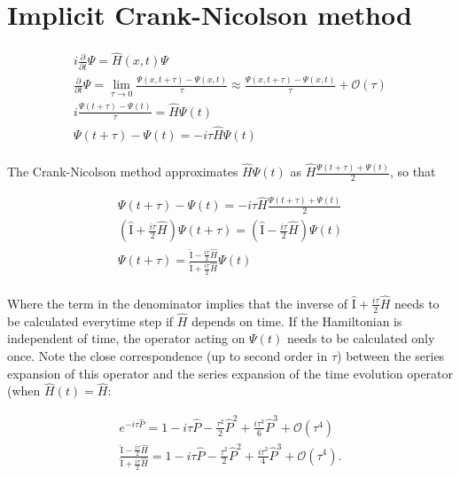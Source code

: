 \section{Implicit Crank-Nicolson method}
\begin{gather*}
i\frac{\partial}{\partial t}\Psi = \hat{H}(x,t)\Psi\\
\frac{\partial}{\partial t}\Psi = \lim_{\tau\rightarrow 0}\frac{\Psi(x,t+\tau)-\Psi(x,t)}{\tau} \approx \frac{\Psi(x,t+\tau)-\Psi(x,t)}{\tau}+\mathcal{O}(\tau)\\
i\frac{\Psi(t+\tau)-\Psi(t)}{\tau} = \hat{H}\Psi(t)\\
\Psi(t+\tau)-\Psi(t) = -i\tau\hat{H}\Psi(t)\\
\end{gather*}

The Crank-Nicolson method approximates $\hat{H}\Psi(t)$ as  $\hat{H}\frac{\Psi(t+\tau)+\Psi(t)}{2}$, so that

\begin{gather*}
\Psi(t+\tau)-\Psi(t) = -i\tau\hat{H}\frac{\Psi(t+\tau)+\Psi(t)}{2}\\
\left(\hat{\mathrm{I}}+\frac{i\tau}{2}\hat{H}\right)\Psi(t+\tau) = \left(\hat{\mathrm{I}}-\frac{i\tau}{2}\hat{H}\right)\Psi(t)\\
\Psi(t+\tau) = \frac{\hat{\mathrm{I}}-\frac{i\tau}{2}\hat{H}}{\hat{\mathrm{I}}+\frac{i\tau}{2}\hat{H}}\Psi(t)\\
\end{gather*}

Where the term in the denominator implies that the inverse of $\hat{\mathrm{I}}+\frac{i\tau}{2}\hat{H}$ needs to be calculated everytime step if $\hat{H}$ depends on time. If the Hamiltonian is independent of time, the operator acting on $\Psi(t)$ needs to be calculated only once. Note the close correspondence (up to second order in $\tau$) between the series expansion of this operator and the series expansion of the time evolution operator (when $\hat{H}(t) = \hat{H}$:

\begin{gather*}
e^{-i\tau\hat{P}} = 1 - i \tau\hat{P} - \frac{\tau^2}{2}\hat{P}^2 + \frac{i\tau^3}{6}\hat{P}^3 + \mathcal{O}(\tau^4)\\
\frac{\hat{\mathrm{I}}-\frac{i\tau}{2}\hat{H}}{\hat{\mathrm{I}}+\frac{i\tau}{2}\hat{H}} = 1 - i \tau\hat{P} - \frac{\tau^2}{2}\hat{P}^2 + \frac{i\tau^3}{4}\hat{P}^3 + \mathcal{O}(\tau^4).\\
\end{gather*}

